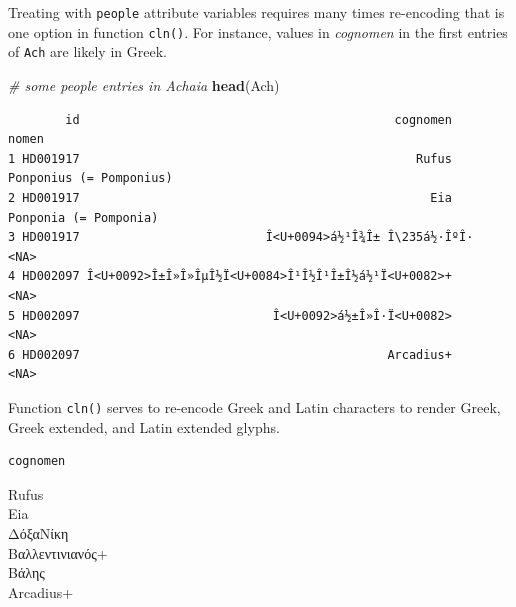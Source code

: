 \documentclass[a4paper,11pt]{memoir}
\newenvironment{Shaded}{\begin{snugshade}}{\end{snugshade}}
\newcommand{\CommentTok}[1]{\textcolor[rgb]{0.56,0.35,0.01}{\textit{#1}}}
\newcommand{\ErrorTok}[1]{\textcolor[rgb]{0.64,0.00,0.00}{\textbf{#1}}}
\newcommand{\KeywordTok}[1]{\textcolor[rgb]{0.13,0.29,0.53}{\textbf{#1}}}
\newcommand{\NormalTok}[1]{#1}
\newcommand{\OperatorTok}[1]{\textcolor[rgb]{0.81,0.36,0.00}{\textbf{#1}}}
\newcommand{\StringTok}[1]{\textcolor[rgb]{0.31,0.60,0.02}{#1}}
\begin{document}
Treating with \texttt{people} attribute variables requires many times
re-encoding that is one option in function \texttt{cln()}. For instance,
values in \emph{cognomen} in the first entries of \texttt{Ach} are
likely in Greek.

\begin{Shaded}
\begin{Highlighting}[]
\CommentTok{# some people entries in Achaia}
\KeywordTok{head}\NormalTok{(Ach)}
\end{Highlighting}
\end{Shaded}

\begin{verbatim}
        id                                            cognomen                   nomen
1 HD001917                                               Rufus Ponponius (= Pomponius)
2 HD001917                                                 Eia   Ponponia (= Pomponia)
3 HD001917                          Î<U+0094>á½¹Î¾Î± Î\235á½·ÎºÎ·                    <NA>
4 HD002097 Î<U+0092>Î±Î»Î»ÎµÎ½Ï<U+0084>Î¹Î½Î¹Î±Î½á½¹Ï<U+0082>+                    <NA>
5 HD002097                           Î<U+0092>á½±Î»Î·Ï<U+0082>                    <NA>
6 HD002097                                           Arcadius+                    <NA>
\end{verbatim}

Function \texttt{cln()} serves to re-encode Greek and Latin characters
to render Greek, Greek extended, and Latin extended glyphs.

\begin{Shaded}
\end{Shaded}

\begin{verbatim}
cognomen
\end{verbatim}

\noindent
Rufus \\
Eia \\
ΔόξαΝίκη \\
Βαλλεντινιανός+ \\
Βάλης \\
Arcadius+ \\
\end{document}
